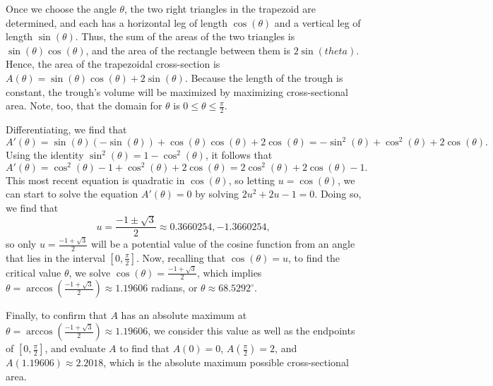 \begin{activitySolution}
Once we choose the angle $\theta$, the two right triangles in the trapezoid are determined, and each has a horizontal leg of length $\cos(\theta)$ and a vertical leg of length $\sin(\theta)$.  Thus, the sum of the areas of the two triangles is $\sin(\theta) \cos(\theta)$, and the area of the rectangle between them is $2\sin(theta)$.  Hence, the area of the trapezoidal cross-section is $A(\theta) = \sin(\theta) \cos(\theta) + 2 \sin(\theta)$.  Because the length of the trough is constant, the trough's volume will be maximized by maximizing cross-sectional area.  Note, too, that the domain for $\theta$ is $0 \le \theta \le \frac{\pi}{2}$.

Differentiating, we find that
$$A'(\theta) = \sin(\theta) (-\sin(\theta)) + \cos(\theta) \cos(\theta) + 2 \cos(\theta) = -\sin^2(\theta) + \cos^2(\theta) + 2 \cos(\theta).$$
Using the identity $\sin^2(\theta) = 1 - \cos^2(\theta)$, it follows that
$$A'(\theta) = \cos^2(\theta) - 1 + \cos^2(\theta) + 2 \cos(\theta) = 2\cos^2(\theta) + 2 \cos(\theta) - 1.$$
This most recent equation is quadratic in $\cos(\theta)$, so letting $u = \cos(\theta)$, we can start to solve the equation $A'(\theta) = 0$ by solving $2u^2 + 2u - 1 = 0$.  Doing so, we find that 
$$u = \frac{-1 \pm \sqrt{3}}{2} \approx 0.3660254, -1.3660254,$$
so only $u = \frac{-1 + \sqrt{3}}{2}$ will be a potential value of the cosine function from an angle that lies in the interval $[0,\frac{\pi}{2}]$.  Now, recalling that $\cos(\theta) = u$, to find the critical value $\theta$, we solve $\cos(\theta) = \frac{-1 + \sqrt{3}}{2}$, which implies $\theta = \arccos(\frac{-1 + \sqrt{3}}{2}) \approx 1.19606$ radians, or $\theta \approx 68.5292^\circ$.

Finally, to confirm that $A$ has an absolute maximum at $\theta = \arccos(\frac{-1 + \sqrt{3}}{2}) \approx 1.19606$, we consider this value as well as the endpoints of $[0, \frac{\pi}{2}]$, and evaluate $A$ to find that $A(0) = 0$, $A(\frac{\pi}{2}) = 2$, and $A(1.19606) \approx 2.2018$, which is the absolute maximum possible cross-sectional area.
\end{activitySolution}
\aftera
